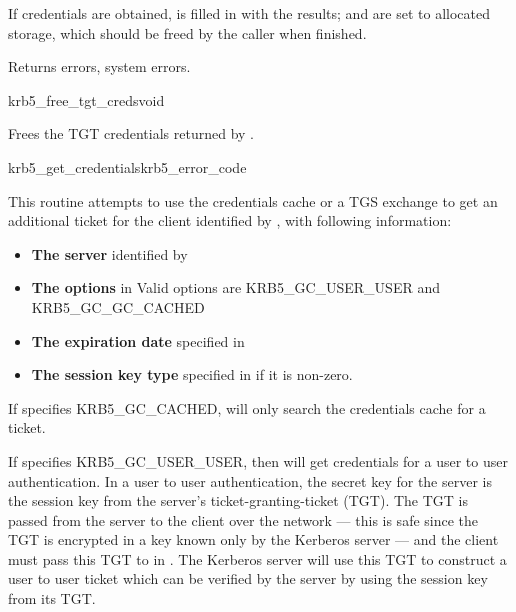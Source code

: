 If credentials are obtained,  is filled in with the results;
 and
 are set to allocated storage,
which should be freed by the caller when finished.

Returns errors, system errors.


\begin{funcdecl}{krb5_free_tgt_creds}{void}{\funcin}
\end{funcdecl}

Frees the TGT credentials  returned by
.

\begin{funcdecl}{krb5_get_credentials}{krb5_error_code}{\funcin}
\funcinout
{}
\end{funcdecl}

This routine attempts to use the credentials cache  or a TGS
exchange to get an additional ticket for the client identified by
, with following information: 
\begin{itemize}
\item {\bf The server} identified by  
\item {\bf The options} in 
Valid options are KRB5_GC_USER_USER and KRB5_GC_GC_CACHED
\item {\bf The expiration date} specified in
\item {\bf The session key type} specified in
 if it is non-zero.
\end{itemize}

If  specifies KRB5_GC_CACHED,
 will only search the credentials cache
for a ticket.  

If  specifies KRB5_GC_USER_USER, then
 will get credentials for a user to user
authentication.  In a user to user authentication, the secret key for
the server 
is the session key from the server's ticket-granting-ticket
(TGT).  The TGT is passed from the server to the client over the
network --- this is safe since the TGT is encrypted in a key
known only by the Kerberos server --- and the client must pass
this TGT to  in
.  The Kerberos server will use
this TGT to construct a user to user ticket which can be verified by
the server by using the session key from its TGT.

